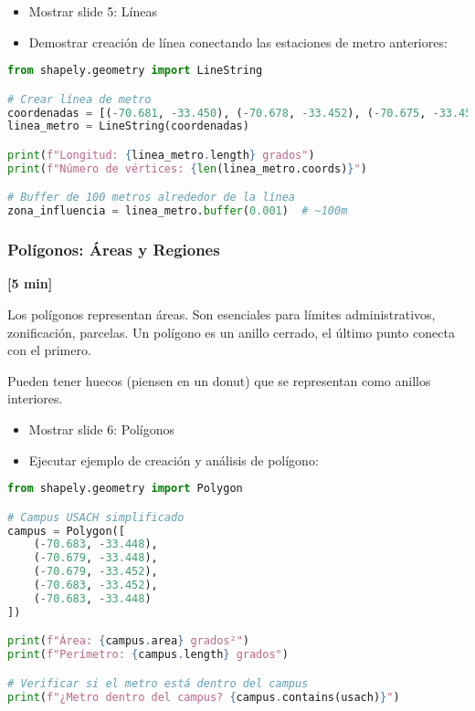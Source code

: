 \documentclass[11pt,a4paper]{article}
\newcommand{\tiempo}[1]{\textcolor{timecolor}{\textbf{[#1]}}}
\newcommand{\decir}[1]{\begin{tcolorbox}[colback=blue!5,colframe=usachblue,title={DECIR}]#1\end{tcolorbox}}
\newcommand{\hacer}[1]{\begin{tcolorbox}[colback=green!5,colframe=green!50!black,title={HACER}]#1\end{tcolorbox}}
\begin{document}
\hacer{
\begin{itemize}
    \item Mostrar slide 5: Líneas
    \item Demostrar creación de línea conectando las estaciones de metro anteriores:
\end{itemize}
}

\begin{lstlisting}[language=Python]
from shapely.geometry import LineString

# Crear línea de metro
coordenadas = [(-70.681, -33.450), (-70.678, -33.452), (-70.675, -33.453)]
linea_metro = LineString(coordenadas)

print(f"Longitud: {linea_metro.length} grados")
print(f"Número de vértices: {len(linea_metro.coords)}")

# Buffer de 100 metros alrededor de la línea
zona_influencia = linea_metro.buffer(0.001)  # ~100m
\end{lstlisting}

\subsubsection{Polígonos: Áreas y Regiones} \tiempo{5 min}

\decir{
Los polígonos representan áreas. Son esenciales para límites administrativos, zonificación, parcelas. Un polígono es un anillo cerrado, el último punto conecta con el primero.

Pueden tener huecos (piensen en un donut) que se representan como anillos interiores.
}

\hacer{
\begin{itemize}
    \item Mostrar slide 6: Polígonos
    \item Ejecutar ejemplo de creación y análisis de polígono:
\end{itemize}
}

\begin{lstlisting}[language=Python]
from shapely.geometry import Polygon

# Campus USACH simplificado
campus = Polygon([
    (-70.683, -33.448),
    (-70.679, -33.448),
    (-70.679, -33.452),
    (-70.683, -33.452),
    (-70.683, -33.448)
])

print(f"Área: {campus.area} grados²")
print(f"Perímetro: {campus.length} grados")

# Verificar si el metro está dentro del campus
print(f"¿Metro dentro del campus? {campus.contains(usach)}")
\end{lstlisting}
\end{document}

